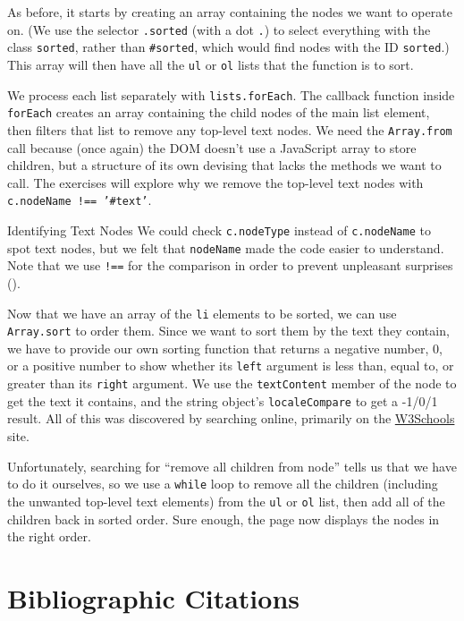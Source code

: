As before,
it starts by creating an array containing the nodes we want to operate on.
(We use the selector \texttt{.sorted} (with a dot \texttt{.}) to select everything with the class \texttt{sorted},
rather than \texttt{\#sorted},
which would find nodes with the ID \texttt{sorted}.)
This array will then have all the \texttt{ul} or \texttt{ol} lists that the function is to sort.

We process each list separately with \texttt{lists.forEach}.
The callback function inside \texttt{forEach} creates an array containing the child nodes of the main list element,
then filters that list to remove any top-level text nodes.
We need the \texttt{Array.from} call because (once again) the DOM doesn't use a JavaScript array to store children,
but a structure of its own devising that lacks the methods we want to call.
The exercises will explore why we remove the top-level text nodes with
\texttt{c.nodeName\ !==\ '\#text'}.

\begin{aside}{Identifying Text Nodes}
  We could check \texttt{c.nodeType} instead of \texttt{c.nodeName} to spot text nodes,
  but we felt that \texttt{nodeName} made the code easier to understand.
  Note that we use \texttt{!==} for the comparison
  in order to prevent unpleasant surprises ().
\end{aside}

Now that we have an array of the \texttt{li} elements to be sorted,
we can use \texttt{Array.sort} to order them.
Since we want to sort them by the text they contain,
we have to provide our own sorting function
that returns a negative number, 0, or a positive number to show whether its \texttt{left} argument is less than,
equal to,
or greater than its \texttt{right} argument.
We use the \texttt{textContent} member of the node to get the text it contains,
and the string object's \texttt{localeCompare} to get a -1/0/1 result.
All of this was discovered by searching online,
primarily on the \href{https://www.w3schools.com/}{W3Schools} site.

Unfortunately,
searching for ``remove all children from node'' tells us that we have to do it ourselves,
so we use a \texttt{while} loop to remove all the children
(including the unwanted top-level text elements)
from the \texttt{ul} or \texttt{ol} list,
then add all of the children back in sorted order.
Sure enough,
the page now displays the nodes in the right order.

\section{Bibliographic Citations}\label{s:pages-citations}

